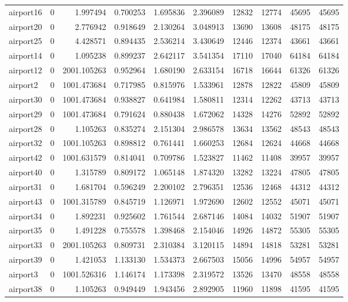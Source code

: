 \begin{longtable}{|l|r|r|r|r|r|r|r|r|r|}
airport16 & 0 & 1.997494 & 0.700253 & 1.695836 & 2.396089 & 12832 & 12774 & 45695 & 45695 \\
airport20 & 0 & 2.776942 & 0.918649 & 2.130264 & 3.048913 & 13690 & 13608 & 48175 & 48175 \\
airport25 & 0 & 4.428571 & 0.894435 & 2.536214 & 3.430649 & 12446 & 12374 & 43661 & 43661 \\
airport14 & 0 & 1.095238 & 0.899237 & 2.642117 & 3.541354 & 17110 & 17040 & 64184 & 64184 \\
airport12 & 0 & 2001.105263 & 0.952964 & 1.680190 & 2.633154 & 16718 & 16644 & 61326 & 61326 \\
airport2 & 0 & 1001.473684 & 0.717985 & 0.815976 & 1.533961 & 12878 & 12822 & 45809 & 45809 \\
airport30 & 0 & 1001.473684 & 0.938827 & 0.641984 & 1.580811 & 12314 & 12262 & 43713 & 43713 \\
airport29 & 0 & 1001.473684 & 0.791624 & 0.880438 & 1.672062 & 14328 & 14276 & 52892 & 52892 \\
airport28 & 0 & 1.105263 & 0.835274 & 2.151304 & 2.986578 & 13634 & 13562 & 48543 & 48543 \\
airport32 & 0 & 1001.105263 & 0.898812 & 0.761441 & 1.660253 & 12684 & 12624 & 44668 & 44668 \\
airport42 & 0 & 1001.631579 & 0.814041 & 0.709786 & 1.523827 & 11462 & 11408 & 39957 & 39957 \\
airport40 & 0 & 1.315789 & 0.809172 & 1.065148 & 1.874320 & 13282 & 13224 & 47805 & 47805 \\
airport31 & 0 & 1.681704 & 0.596249 & 2.200102 & 2.796351 & 12536 & 12468 & 44312 & 44312 \\
airport43 & 0 & 1001.315789 & 0.845719 & 1.126971 & 1.972690 & 12602 & 12552 & 45071 & 45071 \\
airport34 & 0 & 1.892231 & 0.925602 & 1.761544 & 2.687146 & 14084 & 14032 & 51907 & 51907 \\
airport35 & 0 & 1.491228 & 0.755578 & 1.398468 & 2.154046 & 14926 & 14872 & 55305 & 55305 \\
airport33 & 0 & 2001.105263 & 0.809731 & 2.310384 & 3.120115 & 14894 & 14818 & 53281 & 53281 \\
airport39 & 0 & 1.421053 & 1.133130 & 1.534373 & 2.667503 & 15056 & 14996 & 54957 & 54957 \\
airport3 & 0 & 1001.526316 & 1.146174 & 1.173398 & 2.319572 & 13526 & 13470 & 48558 & 48558 \\
airport38 & 0 & 1.105263 & 0.949449 & 1.943456 & 2.892905 & 11960 & 11898 & 41595 & 41595 \\

\end{longtable}
